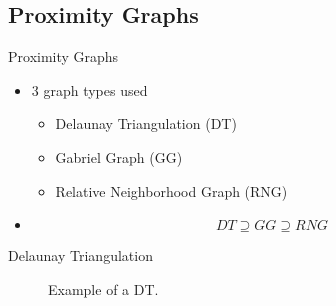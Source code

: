 \documentclass{beamer}
\begin{document}
    \subsection{Proximity Graphs}
        \begin{frame}{Proximity Graphs}
            \begin{itemize}[<+->]
                \item{ 3 graph types used
                    \begin{itemize}
                        \item Delaunay Triangulation (DT) \cite{Katajainen}
                        \item Gabriel Graph (GG) \cite{Gabriel1969}
                        \item Relative Neighborhood Graph (RNG) \cite{Toussaint1980}
                    \end{itemize}
                }
                \item{
                    \begin{equation}
                        DT \supseteq GG \supseteq RNG
                    \end{equation}
                }
            \end{itemize}
        \end{frame}

        \begin{frame}{Delaunay Triangulation}
            \begin{figure}[htbp]
                \centering
                
                \caption
                {
                    Example of a DT.
                }
            \end{figure}
        \end{frame}
\end{document}
